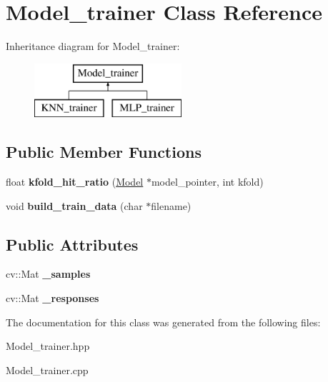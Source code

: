 \hypertarget{class_model__trainer}{\section{Model\+\_\+trainer Class Reference}
\label{class_model__trainer}
}
Inheritance diagram for Model\+\_\+trainer\+:\begin{figure}[H]
\begin{center}
\leavevmode
\includegraphics[height=2.000000cm]{class_model__trainer}
\end{center}
\end{figure}
\subsection*{Public Member Functions}
\begin{DoxyCompactItemize}
\item 
\hypertarget{class_model__trainer_a71ad062509150ce36df481bbe73c9c4d}{float {\bfseries kfold\+\_\+hit\+\_\+ratio} (\hyperlink{class_model}{Model} $\ast$model\+\_\+pointer, int kfold)}\label{class_model__trainer_a71ad062509150ce36df481bbe73c9c4d}

\item 
\hypertarget{class_model__trainer_abb8157d1a46d08611e6ddfd7a51362c8}{void {\bfseries build\+\_\+train\+\_\+data} (char $\ast$filename)}\label{class_model__trainer_abb8157d1a46d08611e6ddfd7a51362c8}

\end{DoxyCompactItemize}
\subsection*{Public Attributes}
\begin{DoxyCompactItemize}
\item 
\hypertarget{class_model__trainer_a74655fde6713837970c23fda25b2384f}{cv\+::\+Mat {\bfseries \+\_\+samples}}\label{class_model__trainer_a74655fde6713837970c23fda25b2384f}

\item 
\hypertarget{class_model__trainer_a70cd895ee8c6d36f20129f1187176ea3}{cv\+::\+Mat {\bfseries \+\_\+responses}}\label{class_model__trainer_a70cd895ee8c6d36f20129f1187176ea3}

\end{DoxyCompactItemize}


The documentation for this class was generated from the following files\+:\begin{DoxyCompactItemize}
\item 
Model\+\_\+trainer.\+hpp\item 
Model\+\_\+trainer.\+cpp\end{DoxyCompactItemize}

